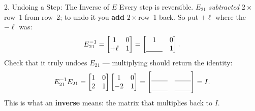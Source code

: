 \documentclass[10pt]{article}
\begin{document}
\begin{notesbox}{2. Undoing a Step: The Inverse of $E$}
Every step is reversible. $E_{21}$ \emph{subtracted} $2\times$row~1 from row~2; to undo it you
\textbf{add} $2\times$row~1 back. So put $+\ell$ where the $-\ell$ was:
\[
  E_{21}^{-1} = \begin{bmatrix} 1 & 0 \\ +\ell & 1 \end{bmatrix} = \begin{bmatrix} 1 & 0 \\ \blank{0.8cm} & 1 \end{bmatrix}.
\]
Check that it truly undoes $E_{21}$ --- multiplying should return the identity:
\[
  E_{21}^{-1}E_{21} = \begin{bmatrix} 1 & 0 \\ 2 & 1 \end{bmatrix}\begin{bmatrix} 1 & 0 \\ -2 & 1 \end{bmatrix}
  = \begin{bmatrix}\rule{0pt}{1.1em}\blank{0.8cm} & \blank{0.8cm}\\[2pt]\blank{0.8cm} & \blank{0.8cm}\end{bmatrix} = I.
\]
This is what an \textbf{inverse} means: the matrix that multiplies back to $I$.
\end{notesbox}
\end{document}
